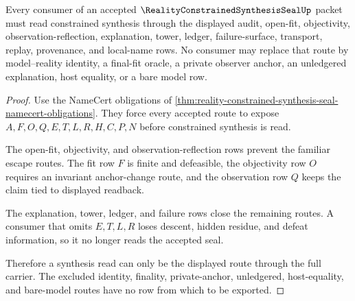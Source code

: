 \begin{theorem}
\label{thm:reality-constrained-synthesis-seal-nonescape}
Every consumer of an accepted $\RealityConstrainedSynthesisSealUp$ packet must read constrained synthesis through the displayed audit, open-fit, objectivity, observation-reflection, explanation, tower, ledger, failure-surface, transport, replay, provenance, and local-name rows. No consumer may replace that route by model--reality identity, a final-fit oracle, a private observer anchor, an unledgered explanation, host equality, or a bare model row.
\end{theorem}
\begin{proof}
Use the NameCert obligations of \autoref{thm:reality-constrained-synthesis-seal-namecert-obligations}. They force every accepted route to expose $A,F,O,Q,E,T,L,R,H,C,P,N$ before constrained synthesis is read.

The open-fit, objectivity, and observation-reflection rows prevent the familiar escape routes. The fit row $F$ is finite and defeasible, the objectivity row $O$ requires an invariant anchor-change route, and the observation row $Q$ keeps the claim tied to displayed readback.

The explanation, tower, ledger, and failure rows close the remaining routes. A consumer that omits $E,T,L,R$ loses descent, hidden residue, and defeat information, so it no longer reads the accepted seal.

Therefore a synthesis read can only be the displayed route through the full carrier. The excluded identity, finality, private-anchor, unledgered, host-equality, and bare-model routes have no row from which to be exported.
\end{proof}

